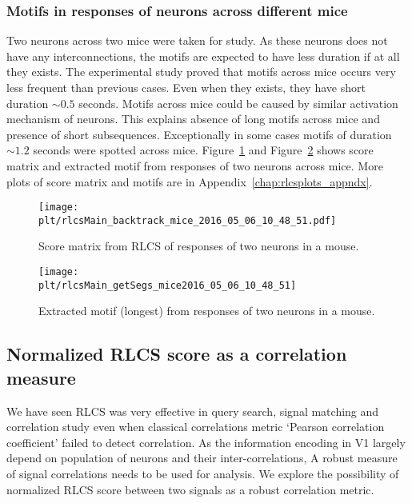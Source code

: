 \documentclass[MTech]{iitmdiss}
\newcommand{\plt}{thesis_plots}
\begin{document}
\subsubsection{Motifs in responses of neurons across different mice} %
\label{ssub:motifs_in_responses_of_neurons_across_different_mice}
Two neurons across two mice were taken for study. As these neurons does not have any interconnections, the motifs are expected to have less duration if at all they exists. The experimental study proved that motifs across mice occurs very less frequent than previous cases. Even when they exists, they have short duration $\sim 0.5$ seconds. Motifs across mice could be caused by similar activation mechanism of neurons. This explains absence of long motifs across mice and presence of short subsequences. Exceptionally in some cases motifs of duration $\sim 1.2$ seconds were spotted across mice. Figure~\ref{img:score_mice} and Figure~\ref{img:motif_mice} shows score matrix and extracted motif from responses of two neurons across mice. More plots of score matrix and motifs are in Appendix~\ref{chap:rlcsplots_appndx}.
\begin{figure}
    \centering
    \texttt{[image: \\plt/rlcsMain\_backtrack\_mice\_2016\_05\_06\_10\_48\_51.pdf]}
    \caption{Score matrix from RLCS of responses of two neurons in a mouse.}
    \label{img:score_mice}
\end{figure}
\begin{figure}
    \centering
    \texttt{[image: \\plt/rlcsMain\_getSegs\_mice2016\_05\_06\_10\_48\_51]}
    \caption{Extracted motif (longest) from responses of two neurons in a mouse.}
    \label{img:motif_mice}
\end{figure}
\subsection{Normalized RLCS score as a correlation measure} %
\label{sub:normalized_rlcs_score_as_a_correlation_metric}
We have seen RLCS was very effective in query search, signal matching and correlation study even when classical correlations metric `Pearson correlation coefficient' failed to detect correlation. As the information encoding in V1 largely depend on population of neurons and their inter-correlations, A robust measure of signal correlations needs to be used for analysis. We explore the possibility of normalized RLCS score between two signals as a robust correlation metric.
\end{document}
